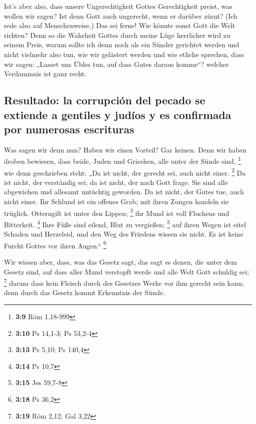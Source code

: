  Ist's aber also, dass unsere Ungerechtigkeit Gottes
Gerechtigkeit preist, was wollen wir sagen? Ist denn Gott auch
ungerecht, wenn er darüber zürnt? (Ich rede also auf Menschenweise.)
 Das sei ferne! Wie könnte sonst Gott die Welt richten?
 Denn so die Wahrheit Gottes durch meine Lüge herrlicher
wird zu seinem Preis, warum sollte ich denn noch als ein Sünder
gerichtet werden  und nicht vielmehr also tun, wie wir
gelästert werden und wie etliche sprechen, dass wir sagen: „Lasset uns
Übles tun, auf dass Gutes daraus komme``? welcher Verdammnis ist ganz
recht.

\hypertarget{resultado-la-corrupciuxf3n-del-pecado-se-extiende-a-gentiles-y-juduxedos-y-es-confirmada-por-numerosas-escrituras}{%
\subsection{Resultado: la corrupción del pecado se extiende a gentiles y
judíos y es confirmada por numerosas
escrituras}\label{resultado-la-corrupciuxf3n-del-pecado-se-extiende-a-gentiles-y-juduxedos-y-es-confirmada-por-numerosas-escrituras}}

 Was sagen wir denn nun? Haben wir einen Vorteil? Gar
keinen. Denn wir haben droben bewiesen, dass beide, Juden und Griechen,
alle unter der Sünde sind, \footnote{\textbf{3:9} Röm 1,18-999}
 wie denn geschrieben steht: „Da ist nicht, der gerecht
sei, auch nicht einer. \footnote{\textbf{3:10} Ps 14,1-3; Ps 53,2-4}
 Da ist nicht, der verständig sei; da ist nicht, der nach
Gott frage.  Sie sind alle abgewichen und allesamt
untüchtig geworden. Da ist nicht, der Gutes tue, auch nicht einer.
 Ihr Schlund ist ein offenes Grab; mit ihren Zungen
handeln sie trüglich. Otterngift ist unter den Lippen; \footnote{\textbf{3:13}
  Ps 5,10; Ps 140,4}  ihr Mund ist voll Fluchens und
Bitterkeit. \footnote{\textbf{3:14} Ps 10,7}  Ihre Füße
sind eilend, Blut zu vergießen; \footnote{\textbf{3:15} Jes 59,7-8}
 auf ihren Wegen ist eitel Schaden und Herzeleid,
 und den Weg des Friedens wissen sie nicht.
 Es ist keine Furcht Gottes vor ihren Augen.``
\footnote{\textbf{3:18} Ps 36,2}

 Wir wissen aber, dass, was das Gesetz sagt, das sagt es
denen, die unter dem Gesetz sind, auf dass aller Mund verstopft werde
und alle Welt Gott schuldig sei; \footnote{\textbf{3:19} Röm 2,12; Gal
  3,22}  darum dass kein Fleisch durch des Gesetzes Werke
vor ihm gerecht sein kann; denn durch das Gesetz kommt Erkenntnis der
Sünde.

